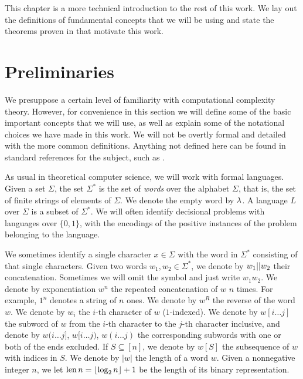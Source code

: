 This chapter is a more technical introduction to the rest of this work. 
We lay out the definitions of fundamental concepts that we will be using
and state the theorems proven in \cite{ConstructiveSeparations} that 
motivate this work. 

\section{Preliminaries}

We presuppose a certain level of familiarity with computational complexity theory. However, 
for convenience in this section we will define some of the basic important concepts 
that we will use, as well as explain some of the notational choices we have made
in this work. We will not be overtly formal and detailed with the more common definitions.
Anything not defined here can be found in standard references for the subject, 
such as \cite{AB09}.

As usual in theoretical computer science, we will work with formal languages.
Given a set $\Sigma$, the set $\Sigma^*$ is the set of \emph{words} over 
the alphabet $\Sigma$, that is, the set of finite strings of elements of $\Sigma$.
We denote the empty word by $\lambda$. 
A language $L$ over $\Sigma$ is a subset of $\Sigma^*$. We will often identify
decisional problems with languages over $\{0, 1\}$, with the encodings of the positive instances of the 
problem belonging to the language. 

We sometimes identify a single character $x \in \Sigma$ with the word in $\Sigma^*$ consisting of that
single characters. Given two words $w_1, w_2 \in \Sigma^*$, we denote by $w_1 || w_2$ their 
concatenation. Sometimes we will omit the symbol and just write $w_1w_2$. We denote by exponentiation
$w^n$ the repeated concatenation of $w$ $n$ times. For example, $1^n$ denotes a string of $n$ ones.
We denote by $w^R$ the reverse of the word $w$. We denote by $w_i$ the $i$-th character of $w$ 
($1$-indexed).
We denote by $w[i \ldots j]$ the subword of 
$w$ from the $i$-th character to the $j$-th character inclusive, and denote by 
$w(i \ldots j]$, $w[i \ldots j)$, $w(i \ldots j)$ the corresponding subwords with one or both of the
ends excluded. If $S \subseteq [n]$, we denote by $w[S]$ the subsequence of $w$ with indices in $S$. 
We denote by $|w|$ the length of a word $w$. Given a nonnegative integer $n$, we let 
$\operatorname{len} n = \lfloor \log_2 n \rfloor + 1$ be the length of its binary representation.  

